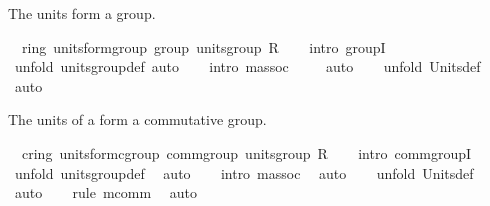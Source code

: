 \begin{isabellebody}
\begin{isamarkuptext}%
The units form a group.%
\end{isamarkuptext}%
\isamarkuptrue%
\isamarkupfalse%
\ {\isacharparenleft}\ ring{\isacharparenright}\ units{\isacharunderscore}form{\isacharunderscore}group{\isacharcolon}\ {\isachardoublequoteopen}group\ {\isacharparenleft}units{\isacharunderscore}group\ R{\isacharparenright}{\isachardoublequoteclose}\isanewline
%
\isadelimproof
\ \ %
\endisadelimproof
%
\isatagproof
{}\isamarkupfalse%
\ {\isacharparenleft}intro\ groupI{\isacharparenright}\isanewline
\ \ \isamarkupfalse%
\ {\isacharparenleft}unfold\ units{\isacharunderscore}group{\isacharunderscore}def{\isacharcomma}\ auto{\isacharparenright}\isanewline
\ \ \isamarkupfalse%
\ {\isacharparenleft}intro\ m{\isacharunderscore}assoc{\isacharparenright}\ \isanewline
\ \ \isamarkupfalse%
\ auto\isanewline
\ \ \isamarkupfalse%
\ {\isacharparenleft}unfold\ Units{\isacharunderscore}def{\isacharparenright}\ \isanewline
\ \ \isamarkupfalse%
\ auto\isanewline
\ \ \isamarkupfalse%
%
\endisatagproof
{\isafoldproof}%
%
\isadelimproof
%
\endisadelimproof
%
\begin{isamarkuptext}%
The units of a  form a commutative group.%
\end{isamarkuptext}%
\isamarkuptrue%
\isamarkupfalse%
\ {\isacharparenleft}\ cring{\isacharparenright}\ units{\isacharunderscore}form{\isacharunderscore}cgroup{\isacharcolon}\ {\isachardoublequoteopen}comm{\isacharunderscore}group\ {\isacharparenleft}units{\isacharunderscore}group\ R{\isacharparenright}{\isachardoublequoteclose}\isanewline
%
\isadelimproof
\ \ %
\endisadelimproof
%
\isatagproof
{}\isamarkupfalse%
\ {\isacharparenleft}intro\ comm{\isacharunderscore}groupI{\isacharparenright}\isanewline
\ \ \isamarkupfalse%
\ {\isacharparenleft}unfold\ units{\isacharunderscore}group{\isacharunderscore}def{\isacharparenright}\ \isamarkupfalse%
\ auto\isanewline
\ \ \isamarkupfalse%
\ {\isacharparenleft}intro\ m{\isacharunderscore}assoc{\isacharparenright}\ \isamarkupfalse%
\ auto\isanewline
\ \ \isamarkupfalse%
\ {\isacharparenleft}unfold\ Units{\isacharunderscore}def{\isacharparenright}\ \isamarkupfalse%
\ auto\isanewline
\ \ \isamarkupfalse%
\ {\isacharparenleft}rule\ m{\isacharunderscore}comm{\isacharparenright}\ \isamarkupfalse%
\ auto\isanewline
\ \ \isamarkupfalse%
%
\endisatagproof
{\isafoldproof}%
%
\isadelimproof
\isanewline
%
\endisadelimproof
\isanewline
\isanewline
%
\isadelimtheory
\isanewline
%
\endisadelimtheory
%
\isatagtheory
{}\isamarkupfalse%
%
\endisatagtheory
{\isafoldtheory}%
%
\isadelimtheory
%
\endisadelimtheory
\end{isabellebody}%
